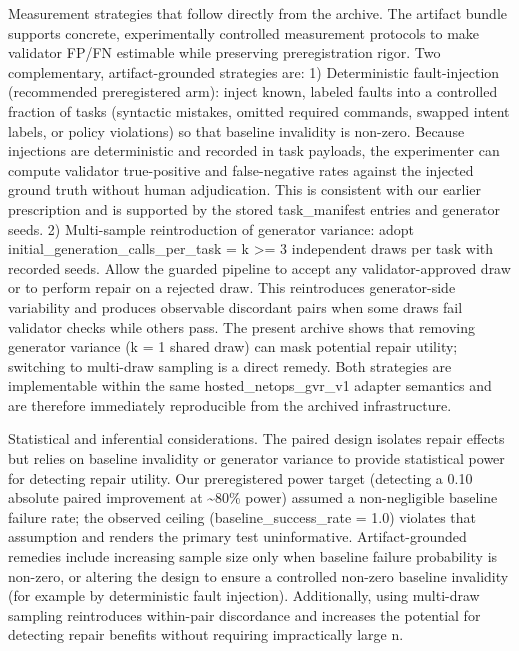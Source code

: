 \documentclass[conference]{IEEEtran}
\begin{document}
Measurement strategies that follow directly from the archive. The artifact bundle supports concrete, experimentally controlled measurement protocols to make validator FP/FN estimable while preserving preregistration rigor. Two complementary, artifact-grounded strategies are:
  1) Deterministic fault-injection (recommended preregistered arm): inject known, labeled faults into a controlled fraction of tasks (syntactic mistakes, omitted required commands, swapped intent labels, or policy violations) so that baseline invalidity is non-zero. Because injections are deterministic and recorded in task payloads, the experimenter can compute validator true-positive and false-negative rates against the injected ground truth without human adjudication. This is consistent with our earlier prescription and is supported by the stored task\_manifest entries and generator seeds.
  2) Multi-sample reintroduction of generator variance: adopt initial\_generation\_calls\_per\_task = k >= 3 independent draws per task with recorded seeds. Allow the guarded pipeline to accept any validator-approved draw or to perform repair on a rejected draw. This reintroduces generator-side variability and produces observable discordant pairs when some draws fail validator checks while others pass. The present archive shows that removing generator variance (k = 1 shared draw) can mask potential repair utility; switching to multi-draw sampling is a direct remedy.
Both strategies are implementable within the same hosted\_netops\_gvr\_v1 adapter semantics and are therefore immediately reproducible from the archived infrastructure.

Statistical and inferential considerations. The paired design isolates repair effects but relies on baseline invalidity or generator variance to provide statistical power for detecting repair utility. Our preregistered power target (detecting a 0.10 absolute paired improvement at \textasciitilde{}80\% power) assumed a non-negligible baseline failure rate; the observed ceiling (baseline\_success\_rate = 1.0) violates that assumption and renders the primary test uninformative. Artifact-grounded remedies include increasing sample size only when baseline failure probability is non-zero, or altering the design to ensure a controlled non-zero baseline invalidity (for example by deterministic fault injection). Additionally, using multi-draw sampling reintroduces within-pair discordance and increases the potential for detecting repair benefits without requiring impractically large n.
\end{document}

